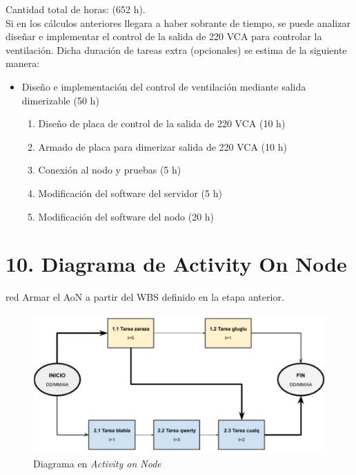 \documentclass[
11pt, %
]{charter}
\begin{document}
Cantidad total de horas: (652 h). \\
Si en los cálculos anteriores llegara a haber sobrante de tiempo, se puede analizar diseñar e implementar el control de la salida de 220 VCA para controlar la ventilación. Dicha duración de tareas extra (opcionales) se estima de la siguiente manera:
\begin{itemize}

\item Diseño e implementación del control de ventilación mediante salida dimerizable (50 h)
	\begin{enumerate}
		\item Diseño de placa de control de la salida de 220 VCA (10 h)
		\item Armado de placa para dimerizar salida de 220 VCA (10 h)
		\item Conexión al nodo y pruebas (5 h)
		\item Modificación del software del servidor (5 h)
		\item Modificación del software del nodo (20 h)
	\end{enumerate}
\end{itemize}

\section{10. Diagrama de Activity On Node}
\label{sec:AoN}

\begin{consigna}{red}
Armar el AoN a partir del WBS definido en la etapa anterior. 



\end{consigna}

\begin{figure}[htpb]
\centering 
\includegraphics[width=.8\textwidth]{./Figuras/AoN.png}
\caption{Diagrama en \textit{Activity on Node}}
\label{fig:AoN}
\end{figure}
\end{document}
